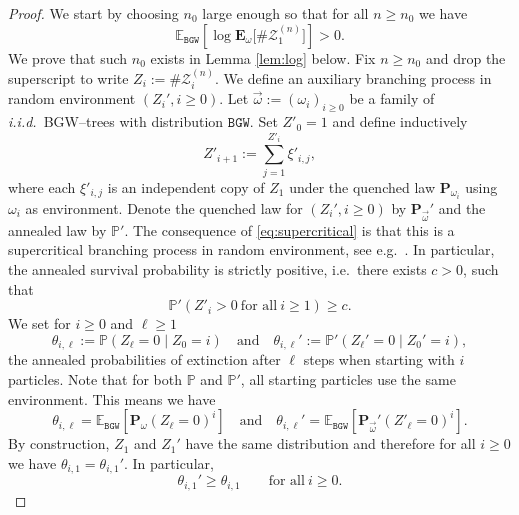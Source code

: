 \documentclass[11 pt]{article}
\theoremstyle{definition}
\numberwithin{equation}{section}
\newcommand{\EE}{\mathbb{E}} %
\newcommand{\PP}{\mathbb{P}} %
\newcommand{\Ps}{\mathbf{P}} %
\newcommand{\Pw}{\mathbf{P}_{\omega}} %
\newcommand{\Ew}{\mathbf{E}_{\omega}} %
\begin{document}
\begin{proof}
	We start by choosing $n_0$ large enough so that for all $n \geq n_0$ we have 
	\begin{equation}\label{eq:supercritical}
		\EE_{\mathtt{BGW}} \left[\log \Ew\big[\#\mathcal{Z}^{(n)}_{1}\big] \right] >0.
	\end{equation}
We prove that such $n_0$ exists in Lemma \ref{lem:log}  below. Fix $n\geq n_0$ and drop the superscript to write 
	$Z_i := \#\mathcal{Z}^{(n)}_{i}$. We define an auxiliary branching process in random environment $(Z_i', i\geq 0)$. 
	Let $\vec{\omega}:=(\omega_{i})_{i\ge 0}$ be a family of \emph{i.i.d.}\ BGW--trees with distribution 
	$\mathtt{BGW}$. Set $Z'_0=1$ and define inductively
	\begin{equation*}
		Z'_{i+1} := \sum_{j=1}^{Z'_i} \xi'_{i,j},
	\end{equation*} 
	where each $\xi'_{i,j}$ is an independent copy of $Z_1$ under the quenched law $\Ps_{\omega_{i}}$ using
	$\omega_{i}$ as environment. Denote the quenched law for $(Z_i', i\geq 0)$ by 
	$\mathbf{P}_{\vec{\omega}}'$ and the annealed law by $\PP'$.
	The consequence of \eqref{eq:supercritical} is that this is a supercritical branching process in random
	 environment, see e.g.\ \cite[Section VI.5]{Ath-Ney}. In particular, the annealed survival probability is strictly 
	positive, i.e.\ there exists $c>0$, such that
	\begin{equation*}
		\PP' (Z'_i>0 ~\text{for all}~ i\ge 1)\geq c.
	\end{equation*}
	We set for $i\ge 0$ and $\ell \ge 1$
	\begin{equation*}
		\theta_{i,\ell} :=\PP \left(Z_\ell=0 \middle\vert Z_0 = i \right) \quad \text{and} \quad \theta_{i,\ell}' :=\PP' \left(Z_\ell'=0 \middle\vert Z_0'= i \right),
	\end{equation*}
	the annealed probabilities of extinction after $\ell$ steps when starting with $i$ particles.
	Note that for both $\PP$ and $\PP'$, all starting particles use the same environment. This means we have
	\begin{equation*}
		\theta_{i,\ell} =\EE_{\mathtt{BGW}}  \left[ \Pw(Z_\ell= 0)^i \right] \quad \text{and} \quad \theta_{i,\ell}' =\EE_{\mathtt{BGW}}  \left[ \mathbf{P}_{\vec{\omega}}'(Z'_\ell= 0)^i \right].
	\end{equation*}
	By construction, $Z_1$ and $Z_1'$ have the 
	same distribution and therefore for all $i\geq 0$ we have $\theta_{i,1} = \theta_{i,1}'$. In particular,
	\begin{equation*}
		\theta_{i,1}' \geq \theta_{i,1} \qquad \text{for all} ~ i\geq 0.

\end{equation*}
\end{proof}
\end{document}
